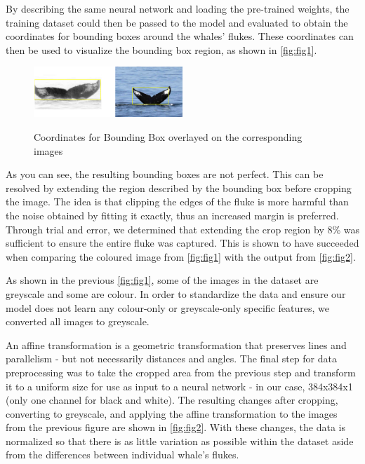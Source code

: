 \documentclass[paper=a4, fontsize=11pt]{scrartcl}
\numberwithin{equation}{section}		%
\numberwithin{table}{section}				%
\begin{document}
By describing the same neural network and loading the pre-trained weights, the training dataset could then be passed to the model and evaluated to obtain the coordinates for bounding boxes around the whales' flukes. These coordinates can then be used to visualize the bounding box region, as shown in \autoref{fig:fig1}.

\begin{figure}[h]
    \caption{Coordinates for Bounding Box overlayed on the corresponding images}
    \centering
    \includegraphics[width=0.5\textwidth]{BoundingBoxExample.png}
    \label{fig:fig1}
\end{figure}

As you can see, the resulting bounding boxes are not perfect. This can be resolved by extending the region described by the bounding box before cropping the image. The idea is that clipping the edges of the fluke is more harmful than the noise obtained by fitting it exactly, thus an increased margin is preferred. Through trial and error, we determined that extending the crop region by 8\% was sufficient to ensure the entire fluke was captured. This is shown to have succeeded when comparing the coloured image from \autoref{fig:fig1} with the output from \autoref{fig:fig2}.

As shown in the previous \autoref{fig:fig1}, some of the images in the dataset are greyscale and some are colour. In order to standardize the data and ensure our model does not learn any colour-only or greyscale-only specific features, we converted all images to greyscale.

An affine transformation is a geometric transformation that preserves lines and parallelism - but not necessarily distances and angles. The final step for data preprocessing was to take the cropped area from the previous step and transform it to a uniform size for use as input to a neural network - in our case, 384x384x1 (only one channel for black and white). The resulting changes after cropping, converting to greyscale, and applying the affine transformation to the images from the previous figure are shown in \autoref{fig:fig2}. With these changes, the data is normalized so that there is as little variation as possible within the dataset aside from the differences between individual whale's flukes.
\end{document}

